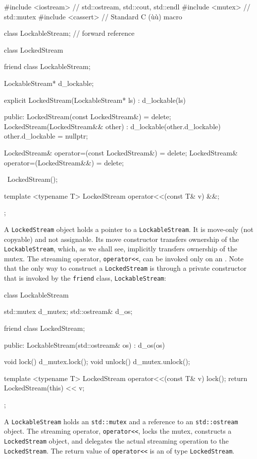 \begin{emcppslisting}
#include <iostream>  // std::ostream, std::cout, std::endl
#include <mutex>     // std::mutex
#include <cassert>   // Standard C (ù{}ù) macro

class LockableStream;  // forward reference

class LockedStream
{
    friend class LockableStream;

    LockableStream* d_lockable;

    explicit LockedStream(LockableStream* ls) : d_lockable(ls) { }

public:
    LockedStream(const LockedStream&) = delete;
    LockedStream(LockedStream&& other) : d_lockable(other.d_lockable)
    {
        other.d_lockable = nullptr;
    }

    LockedStream& operator=(const LockedStream&) = delete;
    LockedStream& operator=(LockedStream&&) = delete;

    ~LockedStream();

    template <typename T> LockedStream operator<<(const T& v) &&;
};
\end{emcppslisting}
    

\noindent A \lstinline!LockedStream! object holds a pointer to a
\lstinline!LockableStream!. It is move-only (not copyable) and not
assignable. Its move constructor transfers ownership of the
\lstinline!LockableStream!, which, as we shall see, implicitly transfers
ownership of the mutex. The streaming operator, \lstinline!operator<<!, can
be invoked only on an . Note that the only way to construct
a \lstinline!LockedStream! is through a private constructor that is invoked
by the \lstinline!friend! class, \lstinline!LockableStream!:

\begin{emcppslisting}
class LockableStream
{
    std::mutex    d_mutex;
    std::ostream& d_os;

    friend class LockedStream;

public:
    LockableStream(std::ostream& os) : d_os(os) { }

    void lock()   { d_mutex.lock(); }
    void unlock() { d_mutex.unlock(); }

    template <typename T> LockedStream operator<<(const T& v)
    {
        lock();
        return LockedStream(this) << v;
    }
};
\end{emcppslisting}
    

\noindent A \lstinline!LockableStream! holds an \lstinline!std::mutex! and a reference
to an \lstinline!std::ostream! object. The streaming operator,
\lstinline!operator<<!, locks the mutex, constructs a \lstinline!LockedStream!
object, and delegates the actual streaming operation to the
\lstinline!LockedStream!. The return value of \lstinline!operator<<! is an
 of type \lstinline!LockedStream!.

